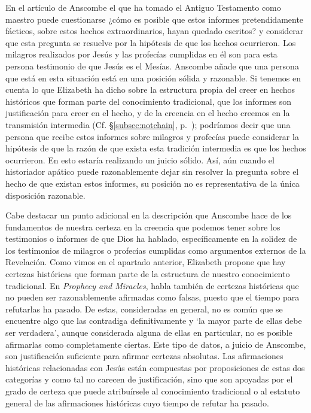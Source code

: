 En el artículo de Anscombe el que ha tomado el Antiguo Testamento como maestro puede cuestionarse ¿cómo es posible que estos informes pretendidamente fácticos, sobre estos hechos extraordinarios, hayan quedado escritos? y considerar que esta pregunta se resuelve por la hipótesis de que los hechos ocurrieron. Los milagros realizados por Jesús y las profecías cumplidas en él son para esta persona testimonio de que Jesús es el Mesías. Anscombe añade que una persona que está en esta situación está en una posición sólida y razonable. Si tenemos en cuenta lo que Elizabeth ha dicho sobre la estructura propia del creer en hechos históricos que forman parte del conocimiento tradicional, que los informes son justificación para creer en el hecho, y de la creencia en el hecho creemos en la transmisión intermedia (Cf. \S\ref{subsec:notchain}, p.~\pageref{subsec:notchain}); podríamos decir que una persona que recibe estos informes sobre milagros y profecías puede considerar la hipótesis de que la razón de que exista esta tradición intermedia es que los hechos ocurrieron. En esto estaría realizando un juicio sólido. Así, aún cuando el historiador apático puede razonablemente dejar sin resolver la pregunta sobre el hecho de que existan estos informes, su posición no es representativa de la única disposición razonable.

Cabe destacar un punto adicional en la descripción que Anscombe hace de los fundamentos de nuestra certeza en la creencia que podemos tener sobre los testimonios o informes de que Dios ha hablado, específicamente en la solidez de los testimonios de milagros o profecías cumplidas como argumentos externos de la Revelación. Como vimos en el apartado anterior, Elizabeth propone que hay certezas históricas que forman parte de la estructura de nuestro conocimiento tradicional. En \emph{Prophecy and Miracles}, habla también de certezas históricas que no pueden ser razonablemente afirmadas como falsas, puesto que el tiempo para refutarlas ha pasado. De estas, consideradas en general, no es común que se encuentre algo que las contradiga definitivamente y \enquote*{la mayor parte de ellas debe ser verdadera}, aunque considerada alguna de ellas en particular, no es posible afirmarlas como completamente ciertas. Este tipo de datos, a juicio de Anscombe, son justificación suficiente para afirmar certezas absolutas. Las afirmaciones históricas relacionadas con Jesús están compuestas por proposiciones de estas dos categorías y como tal no carecen de justificación, sino que son apoyadas por el grado de certeza que puede atribuírsele al conocimiento tradicional o al estatuto general de las afirmaciones históricas cuyo tiempo de refutar ha pasado.


